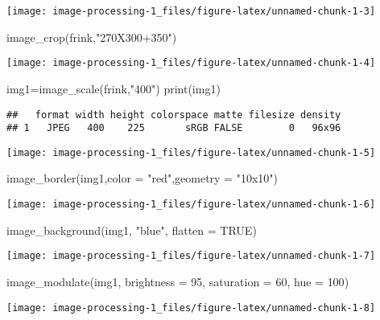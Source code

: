 \documentclass[
]{article}
\newenvironment{Shaded}{\begin{snugshade}}{\end{snugshade}}
\newcommand{\AttributeTok}[1]{\textcolor[rgb]{0.77,0.63,0.00}{#1}}
\newcommand{\ConstantTok}[1]{\textcolor[rgb]{0.00,0.00,0.00}{#1}}
\newcommand{\DecValTok}[1]{\textcolor[rgb]{0.00,0.00,0.81}{#1}}
\newcommand{\FunctionTok}[1]{\textcolor[rgb]{0.00,0.00,0.00}{#1}}
\newcommand{\NormalTok}[1]{#1}
\newcommand{\OtherTok}[1]{\textcolor[rgb]{0.56,0.35,0.01}{#1}}
\newcommand{\StringTok}[1]{\textcolor[rgb]{0.31,0.60,0.02}{#1}}
\begin{document}
\texttt{[image: image-processing-1\_files/figure-latex/unnamed-chunk-1-3]}

\begin{Shaded}
\begin{Highlighting}[]
\FunctionTok{image\_crop}\NormalTok{(frink,}\StringTok{"270X300+350"}\NormalTok{)}
\end{Highlighting}
\end{Shaded}

\texttt{[image: image-processing-1\_files/figure-latex/unnamed-chunk-1-4]}

\begin{Shaded}
\begin{Highlighting}[]
\NormalTok{img1}\OtherTok{=}\FunctionTok{image\_scale}\NormalTok{(frink,}\StringTok{"400"}\NormalTok{)}
\FunctionTok{print}\NormalTok{(img1)}
\end{Highlighting}
\end{Shaded}

\begin{verbatim}
##   format width height colorspace matte filesize density
## 1   JPEG   400    225       sRGB FALSE        0   96x96
\end{verbatim}

\texttt{[image: image-processing-1\_files/figure-latex/unnamed-chunk-1-5]}

\begin{Shaded}
\begin{Highlighting}[]
\FunctionTok{image\_border}\NormalTok{(img1,}\AttributeTok{color =} \StringTok{"red"}\NormalTok{,}\AttributeTok{geometry =} \StringTok{"10x10"}\NormalTok{)}
\end{Highlighting}
\end{Shaded}

\texttt{[image: image-processing-1\_files/figure-latex/unnamed-chunk-1-6]}

\begin{Shaded}
\begin{Highlighting}[]
\FunctionTok{image\_background}\NormalTok{(img1, }\StringTok{"blue"}\NormalTok{, }\AttributeTok{flatten =} \ConstantTok{TRUE}\NormalTok{)}
\end{Highlighting}
\end{Shaded}

\texttt{[image: image-processing-1\_files/figure-latex/unnamed-chunk-1-7]}

\begin{Shaded}
\begin{Highlighting}[]
\FunctionTok{image\_modulate}\NormalTok{(img1, }\AttributeTok{brightness =} \DecValTok{95}\NormalTok{, }\AttributeTok{saturation =} \DecValTok{60}\NormalTok{, }\AttributeTok{hue =} \DecValTok{100}\NormalTok{)}
\end{Highlighting}
\end{Shaded}

\texttt{[image: image-processing-1\_files/figure-latex/unnamed-chunk-1-8]}
\end{document}
